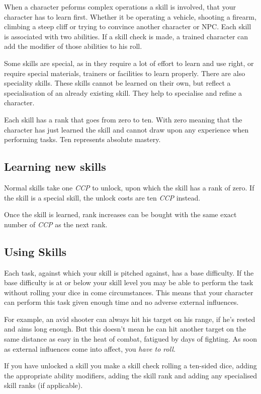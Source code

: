 \documentclass[11pt,a4paper,openany]{scrbook}
\begin{document}
When a character peforms complex operations a skill is involved, that your
character has to learn first. Whether it be operating a vehicle, shooting a
firearm, climbing a steep cliff or trying to convince another character or
NPC. Each skill is associated with two abilities. If a skill check is made,
a trained character can add the modifier of those abilities to his roll.

Some skills are special, as in they require a lot of effort to learn and use
right, or require special materials, trainers or facilities to learn properly.
There are also speciality skills. These skills cannot be learned on their own,
but reflect a specialisation of an already existing skill. They help to
specialise and refine a character.

Each skill has a rank that goes from zero to ten. With zero meaning that the
character has just learned the skill and cannot draw upon any experience when
performing tasks. Ten represents absolute mastery.

\subsection{Learning new skills}

Normal skills take one \emph{CCP} to unlock, upon which the skill has a rank
of zero. If the skill is a special skill, the unlock costs are ten \emph{CCP}
instead.

Once the skill is learned, rank increases can be bought with the same exact
number of \emph{CCP} as the next rank.

\subsection{Using Skills}

Each task, against which your skill is pitched against, has a base difficulty.
If the base difficulty is at or below your skill level you may be able to
perform the task without rolling your dice in come circumstances. This means
that your character can perform this task given enough time and no adverse
external influences.

For example, an avid shooter can always hit his target on his range, if he's
rested and aims long enough. But this doesn't mean he can hit another target
on the same distance as easy in the heat of combat, fatigued by days of
fighting. As soon as external influences come into affect, you \emph{have to
  roll}.

If you have unlocked a skill you make a skill check rolling a ten-sided dice,
adding the appropriate ability modifiers, adding the skill rank and adding any
specialised skill ranks (if applicable).
\end{document}
